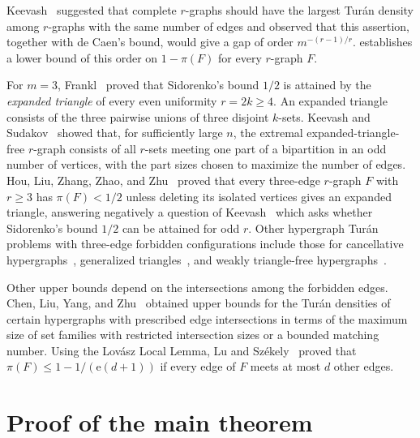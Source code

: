 \documentclass[10pt]{article}
\numberwithin{equation}{section}
\begin{document}
Keevash~\cite[Remark~(1)]{Keevash05} suggested that complete $r$-graphs should have the largest Tur\'an density among $r$-graphs with the same number of edges and observed that this assertion, together with de Caen's bound, would give a gap of order $m^{-(r-1)/r}$.  establishes a lower bound of this order on $1-\pi(F)$ for every $r$-graph $F$.

For $m=3$, Frankl~\cite{Frankl90} proved that Sidorenko's bound $1/2$ is attained by the \emph{expanded triangle} of every even uniformity $r=2k\ge4$. An expanded triangle consists of the three pairwise unions of three disjoint $k$-sets. Keevash and Sudakov~\cite[Theorem~1.1]{KeevashSudakov05} showed that, for sufficiently large $n$, the extremal expanded-triangle-free $r$-graph consists of all $r$-sets meeting one part of a bipartition in an odd number of vertices, with the part sizes chosen to maximize the number of edges.
Hou, Liu, Zhang, Zhao, and Zhu~\cite[Theorem~1.1 and Corollary~1.2]{HouLiuZhangZhaoZhu25} proved that every three-edge $r$-graph $F$ with $r\ge3$ has $\pi(F)<1/2$ unless deleting its isolated vertices gives an expanded triangle,  answering negatively a question of Keevash~\cite[Remark~(2)]{Keevash05} which asks whether Sidorenko's bound $1/2$ can be attained for odd $r$. Other hypergraph Tur\'an problems with three-edge forbidden configurations include those for cancellative hypergraphs~\cite{Bollobas74,KeevashMubayi04}, generalized triangles~\cite{FranklFuredi89,Pikhurko08}, and weakly triangle-free hypergraphs~\cite{MubayiPikhurkoSudakov11,LiuMantel25}.

Other upper bounds depend on the intersections among the forbidden edges. Chen, Liu, Yang, and Zhu~\cite[Theorems~1.1 and~1.3]{ChenLiuYangZhu26} obtained upper bounds for the Tur\'an densities of certain hypergraphs with prescribed edge intersections in terms of the maximum size of set families with restricted intersection sizes or a bounded matching number. Using the Lov\'asz Local Lemma, Lu and Sz\'ekely~\cite[Theorem~4]{LuSzekely07} proved that $\pi(F)\le1-1/(\mathrm e(d+1))$ if every edge of $F$ meets at most $d$ other edges.

\section{Proof of the main theorem}\label{sec:proof}
\end{document}
